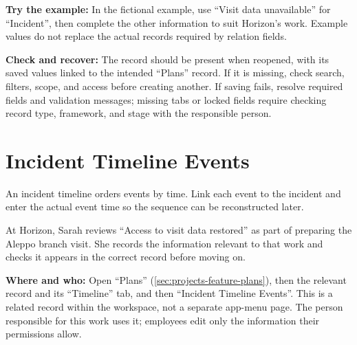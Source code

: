 \textbf{Try the example:} In the fictional example, use “Visit data unavailable” for “Incident”, then complete the other information to suit Horizon's work. Example values do not replace the actual records required by relation fields.

\textbf{Check and recover:} The record should be present when reopened, with its saved values linked to the intended “Plans” record. If it is missing, check search, filters, scope, and access before creating another. If saving fails, resolve required fields and validation messages; missing tabs or locked fields require checking record type, framework, and stage with the responsible person.

\clearpage
\section{Incident Timeline Events}
\label{sec:projects-feature-planning-incident-events}

An incident timeline orders events by time. Link each event to the incident and enter the actual event time so the sequence can be reconstructed later.

\begin{rcnote}
At Horizon, Sarah reviews “Access to visit data restored” as part of preparing the Aleppo branch visit. She records the information relevant to that work and checks it appears in the correct record before moving on.
\end{rcnote}

\textbf{Where and who:} Open “Plans” (\ref{sec:projects-feature-plans}), then the relevant record and its “Timeline” tab, and then “Incident Timeline Events”. This is a related record within the workspace, not a separate app-menu page. The person responsible for this work uses it; employees edit only the information their permissions allow.

